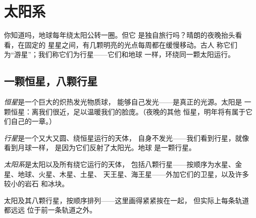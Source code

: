 \chapter{太阳系}\label{ch:g4:solar-system}

你知道吗，地球每年绕太阳公转一圈。但它
是独自旅行吗？晴朗的夜晚抬头看看，在固定的
星星之间，有几颗明亮的光点每周都在缓慢移动。古人
称它们为“游星”；我们称它们为行星——它们和地球
一样，环绕同一颗太阳运行。

\section{一颗恒星，八颗行星}

\begin{definition}[恒星]\label{def:g4:solar-system:star}
\emph{恒星}是一个巨大的炽热发光物质球，
能够自己发光——是真正的光源。太阳是
一颗恒星：离我们很近，足以温暖我们的脸庞。（夜晚的其他
恒星，明年将有属于它们自己的一章。）
\end{definition}

\begin{definition}[行星]\label{def:g4:solar-system:planet}
\emph{行星}是一个又大又圆、绕恒星运行的天体，
自身不发光——我们看到行星，就像看到月球一样，
是因为它们反射了太阳光。地球
是一颗行星。
\end{definition}

\begin{definition}[太阳系]\label{def:g4:solar-system:family}
\emph{太阳系}是太阳以及所有绕它运行的天体，
包括八颗行星——按顺序为水星、金星、地球、火星、木星、土星、
天王星、海王星——外加它们的卫星，以及许多较小的岩石
和冰块。
\end{definition}

\begin{omfigure}

{\small 太阳及其八颗行星，按顺序排列——这里画得紧紧挨在一起，
但实际上每条轨道都远远
位于前一条轨道之外。}
\end{omfigure}

